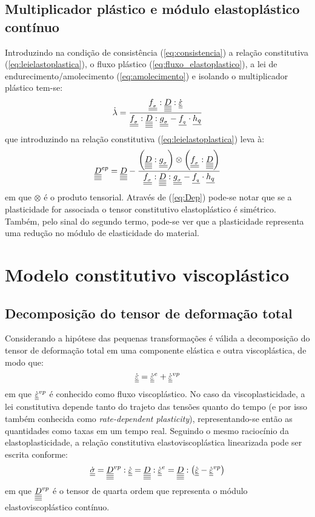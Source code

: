 \subsection{Multiplicador plástico e módulo elastoplástico contínuo}
Introduzindo na condição de consistência (\ref{eq:consistencia}) a relação constitutiva (\ref{eq:leielastoplastica}), o fluxo plástico (\ref{eq:fluxo_elastoplastico}), a lei de endurecimento/amolecimento (\ref{eq:amolecimento}) e isolando o multiplicador plástico tem-se:
\begin{equation}
	\label{eq:lambda}
	\dot \lambda = \dfrac{\underline{\underline {f_{_\sigma}}}:\underline{\underline{\underline{\underline D}}}:\dot {\underline{\underline \varepsilon}}}{\underline{\underline {f_{_\sigma}}}:\underline{\underline{\underline{\underline D}}}:\underline{\underline {g_{_\sigma}}}-\underline{f_{_q}} \cdot \underline{h_q}}
\end{equation}
que introduzindo na relação constitutiva (\ref{eq:leielastoplastica}) leva à:
\begin{equation}
	\label{eq:Dep}
	\underline{\underline{\underline{\underline D}}}^{ep} = \underline{\underline{\underline{\underline D}}} - \dfrac{\left(\underline{\underline{\underline{\underline D}}}:\underline{\underline {g_{_\sigma}}} \right)\otimes\left(\underline{\underline {f_{_\sigma}}}:\underline{\underline{\underline{\underline D}}} \right)}{\underline{\underline {f_{_\sigma}}}:\underline{\underline{\underline{\underline D}}}:\underline{\underline {g_{_\sigma}}}-\underline{f_{_q}} \cdot \underline{h_q}}
\end{equation}
em que $\otimes$ é o produto tensorial. Através de (\ref{eq:Dep}) pode-se notar que se a plasticidade for associada o tensor constitutivo elastoplástico é simétrico. Também, pelo sinal do segundo termo, pode-se ver que a plasticidade representa uma redução no módulo de elasticidade do material.

\section{Modelo constitutivo viscoplástico}

\subsection{Decomposição do tensor de deformação total}
Considerando a hipótese das pequenas transformações é válida a decomposição do tensor de deformação total em uma componente elástica e outra viscoplástica, de modo que:
\begin{equation}
	\label{eq:decomposicao_deformacoes_vp}
	\dot {\underline{\underline \varepsilon}} = \dot {\underline{\underline \varepsilon}}^e + \dot {\underline{\underline \varepsilon}}^{vp} 
\end{equation}
em que $\dot {\underline{\underline \varepsilon}}^{vp}$ é conhecido como fluxo viscoplástico. No caso da viscoplasticidade, a lei constitutiva depende tanto do trajeto das tensões quanto do tempo (e por isso também conhecida como \textit{rate-dependent plasticity}), representando-se então as quantidades como taxas em um tempo real. Seguindo o mesmo raciocínio da elastoplasticidade, a relação constitutiva elastoviscoplástica linearizada pode ser escrita conforme:
\begin{equation}
	\label{eq:leielastoviscoplastica}
	\dot {\underline{\underline \sigma}} = \underline{\underline{\underline{\underline D}}}^{vp}:\dot {\underline{\underline \varepsilon}} = \underline{\underline{\underline{\underline D}}}:\dot {\underline{\underline \varepsilon}}^e = \underline{\underline{\underline{\underline D}}}:\left(\dot {\underline{\underline \varepsilon}} - \dot {\underline{\underline \varepsilon}}^{vp} \right)
\end{equation}
em que $\underline{\underline{\underline{\underline D}}}^{vp}$ é o tensor de quarta ordem que representa o módulo elastoviscoplástico contínuo.

